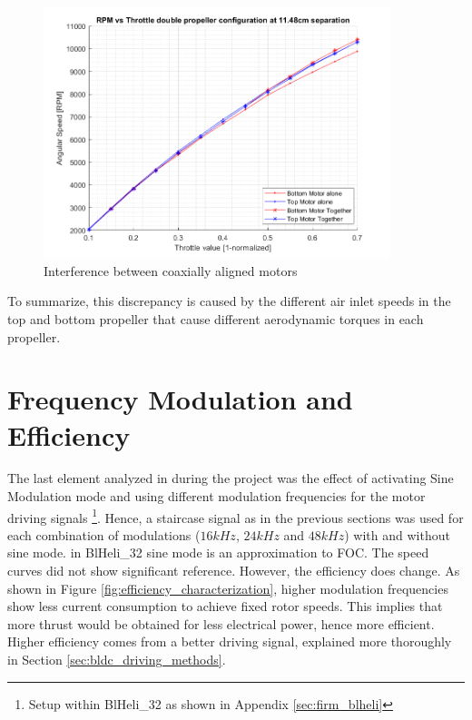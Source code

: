 \begin{figure}
  \centering
  \includegraphics[width=0.9\textwidth]{images/mot_interference.png}
  \caption{Interference between coaxially aligned motors}
  \label{fig:mot_interference}
\end{figure}

To summarize, this discrepancy is caused by the different air inlet speeds in the top and bottom propeller that cause different aerodynamic torques in each propeller.


\section{Frequency Modulation and Efficiency}

The last element analyzed in during the project was the effect of activating Sine Modulation mode and using different modulation frequencies for the motor driving signals \footnote{Setup within BlHeli\_32 as shown in Appendix \ref{sec:firm_blheli}}. Hence, a staircase signal as in the previous sections was used for each combination of modulations ($16kHz$, $24kHz$ and $48kHz$) with and without sine mode. in BlHeli\_32 sine mode is an approximation to FOC. The speed curves did not show significant reference. However, the efficiency does change. As shown in Figure \ref{fig:efficiency_characterization}, higher modulation frequencies show less current consumption to achieve fixed rotor speeds. This implies that more thrust would be obtained for less electrical power, hence more efficient.\\

Higher efficiency comes from a better driving signal, explained more thoroughly in Section \ref{sec:bldc_driving_methods}.

